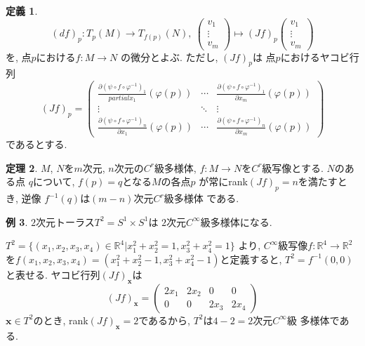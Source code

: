 \documentclass[twocolumn]{jarticle}
\theoremstyle{definition}
\newtheorem{theorem}{定理}[section]
\newtheorem{definition}[theorem]{定義}
\newtheorem{example}[theorem]{例}
\begin{document}
\begin{definition}\label{def:differential}
  $$(df)_p:T_p(M)\to T_{f(p)}(N),\ 
  \begin{pmatrix}
    v_1\\
    \vdots \\
    v_m
  \end{pmatrix}
  \mapsto
  (Jf)_p
  \begin{pmatrix}
    v_1\\
    \vdots \\
    v_m
  \end{pmatrix}$$
  を, 点$p$における$f:M\to N$
  の微分とよぶ. ただし, $(Jf)_p$は
  点$p$におけるヤコビ行列
  $$(Jf)_p=
  \left(
  \begin{array}{ccc}
    \frac{\partial (\psi\circ f\circ \varphi^{-1})_1}{partial x_1}(\varphi(p))&\cdots &\frac{\partial (\psi\circ f\circ \varphi^{-1})_1}{\partial x_m}(\varphi(p))\\
    \vdots &\ddots& \vdots \\
    \frac{\partial (\psi\circ f\circ \varphi^{-1})_n}{\partial x_1}(\varphi(p))&\cdots &\frac{\partial (\psi\circ f\circ \varphi^{-1})_n}{\partial x_m}(\varphi(p)) 
  \end{array} 
  \right)$$
  であるとする. 
\end{definition}
\begin{theorem}\label{theo:f^{-1}(q) C^r manifold}
  $M$, $N$を$m$次元, $n$次元の$C^r$級多様体, 
  $f:M\to N$を$C^r$級写像とする. $N$のある点
  $q$について, $f(p)=q$となる$M$の各点$p$
  が常にrank$(Jf)_p=n$を満たすとき, 逆像
  $f^{-1}(q)$は$(m-n)$次元$C^r$級多様体
  である. 
\end{theorem}

\begin{example}
  $2$次元トーラス$T^2=S^1\times S^1$は
  $2$次元$C^\infty$級多様体になる. 

  $T^2=\{(x_1,x_2,x_3,x_4)\in \mathbb{R}^4|
  x_1^2+x_2^2=1, x_3^2+x_4^2=1\}$
  より, 
  $C^\infty$級写像$f:\mathbb{R}^4\to \mathbb{R}^2$
  を$f(x_1,x_2,x_3,x_4)=(x_1^2+x_2^2-1,
  x_3^2+x_4^2-1)$と定義すると, 
  $T^2=f^{-1}(0,0)$
  と表せる. ヤコビ行列$(Jf)_{\boldsymbol{x}}$は
  $$(Jf)_{\boldsymbol{x}}=
      \left(\begin{array}{cccc}
          2x_1&2x_2&0&0\\
          0&0&2x_3&2x_4
      \end{array}\right)$$
  $\boldsymbol{x}\in T^2$のとき, 
  rank$(Jf)_{\boldsymbol{x}}=2$であるから, 
  $T^2$は$4-2=2$次元$C^\infty$級
  多様体である. 
\end{example}
\end{document}
